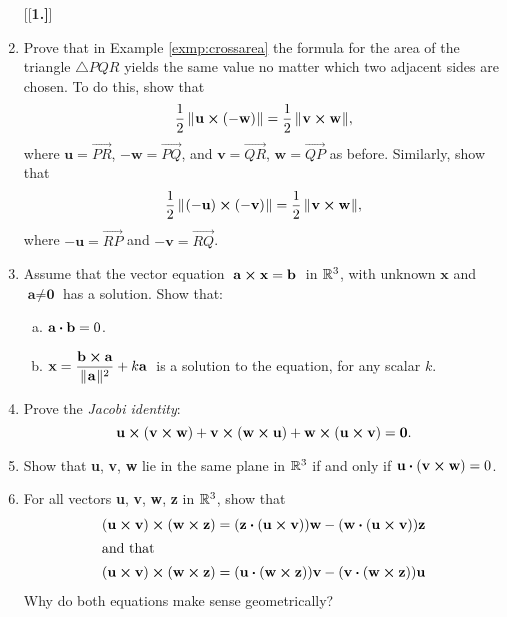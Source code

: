 \begin{enumerate}[\bfseries 1.]
[{[\bfseries 1.]}]
\item
Prove that in Example \ref{exmp:crossarea} the formula for the area of the triangle $\triangle PQR$ 
yields the same value no matter which two adjacent sides are chosen. 
To do this, show that
\[\frac{1}{2}\,\lVert\mspace{1mu}\textbf{u} \bm{\times} (-\textbf{w})\mspace{1mu}\rVert = \frac{1}{2}\,\lVert\mspace{1mu}\textbf{v} \bm{\times} \textbf{w}\mspace{1mu}\rVert,\]
where 
$\textbf{u} = \overrightarrow{PR}$, 
$-\textbf{w} = \overrightarrow{PQ}$, 
and $\textbf{v} = \overrightarrow{QR}$, 
$\textbf{w} = \overrightarrow{QP}$ as before. 
Similarly, show that
\[\frac{1}{2}\,\lVert\mspace{1mu}(-\textbf{u}) \bm{\times} (-\textbf{v})\mspace{1mu}\rVert =
  \frac{1}{2}\,\lVert\mspace{1mu}\textbf{v} \bm{\times} \textbf{w}\mspace{1mu}\rVert,\] 
where 
$-\textbf{u} = \overrightarrow{RP}$ 
and $-\textbf{v} = \overrightarrow{RQ}$.
\item 
Assume that the vector equation $\thickspace\textbf{a} \bm{\times} \textbf{x} = \textbf{b}\thickspace$ in $\mathbb{R}^{3}$, 
with unknown $\textbf{x}$ and $\textbf{a} \ne \textbf{0}$ has a solution.
Show that:
  \begin{enumerate}[(a)]
   \item $\textbf{a} \bm{\cdot} \textbf{b} = 0$.
   \item $\textbf{x} = \dfrac{\textbf{b} \bm{\times} \textbf{a}}{\lVert\mspace{1mu}\textbf{a}\mspace{1mu}\rVert^2} + k \textbf{a}\thickspace$
   is a solution to the equation, for any scalar $k$.
  \end{enumerate}
 \item Prove the \emph{Jacobi identity}:
  \[\textbf{u} \bm{\times} (\textbf{v} \bm{\times} \textbf{w}) +
  \textbf{v} \bm{\times} (\textbf{w} \bm{\times} \textbf{u}) +
  \textbf{w} \bm{\times} (\textbf{u} \bm{\times} \textbf{v}) = \textbf{0}.\]
 \item Show that \textbf{u}, \textbf{v}, \textbf{w} lie in the same plane in $\mathbb{R}^{3}$ if and only if
  $\textbf{u} \bm{\cdot} (\textbf{v} \bm{\times} \textbf{w}) = 0$.
 \item For all vectors \textbf{u}, \textbf{v}, \textbf{w}, \textbf{z} in $\mathbb{R}^{3}$, show that
  \begin{align*}
   (\textbf{u} \bm{\times} \textbf{v}) \bm{\times} (\textbf{w} \bm{\times} \textbf{z}) &=
    (\textbf{z} \bm{\cdot} (\textbf{u} \bm{\times} \textbf{v}))\textbf{w} -
    (\textbf{w} \bm{\cdot} (\textbf{u} \bm{\times} \textbf{v}))\textbf{z}\\
   \intertext{and that}
   (\textbf{u} \bm{\times} \textbf{v}) \bm{\times} (\textbf{w} \bm{\times} \textbf{z}) &=
    (\textbf{u} \bm{\cdot} (\textbf{w} \bm{\times} \textbf{z}))\textbf{v} -
    (\textbf{v} \bm{\cdot} (\textbf{w} \bm{\times} \textbf{z}))\textbf{u}
  \end{align*}
  Why do both equations make sense geometrically?
\end{enumerate}
\newpage
